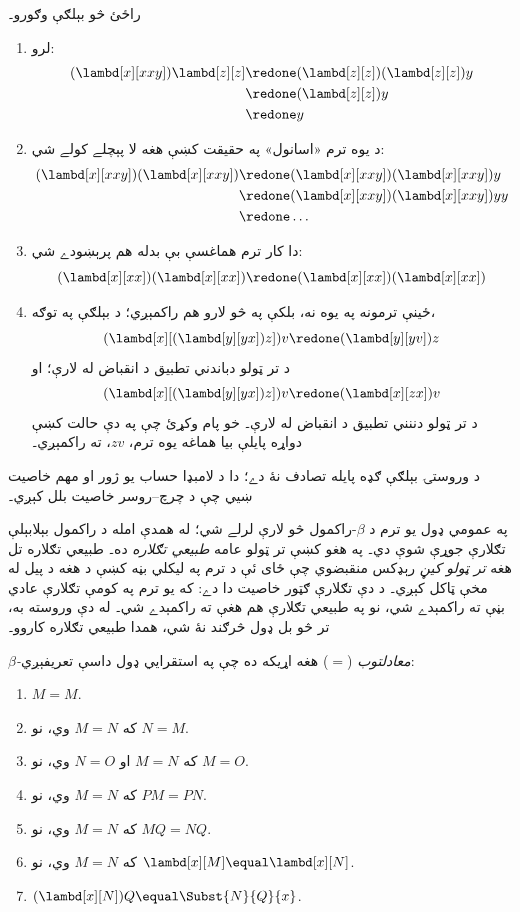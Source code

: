 \documentclass[../../../include/open-logic-section]{subfiles}
\begin{document}
راځئ څو بېلګې وګورو۔
\begin{enumerate}
\item لرو:
\begin{align*}
(\lambd[x][xxy]) \lambd[z][z] & \redone (\lambd[z][z])(\lambd[z][z]) y \\
& \redone (\lambd[z][z]) y \\
& \redone y
\end{align*}
\item د يوه ترم «اسانول» په حقيقت کښې هغه لا پېچلے کولے شي:
\begin{align*}
(\lambd[x][xxy])(\lambd[x][xxy]) & \redone (\lambd[x][xxy])(\lambd[x][xxy])y \\
& \redone (\lambd[x][xxy])(\lambd[x][xxy])yy \\
& \redone \dots
\end{align*}
\item دا کار ترم هماغسې بې بدله هم پرېښودے شي:
\[
(\lambd[x][xx])(\lambd[x][xx]) \redone (\lambd[x][xx])(\lambd[x][xx])
\]
\item ځينې ترمونه په يوه نه، بلکې په څو لارو هم راکمېږي؛
  د بېلګې په توګه،
\[
(\lambd[x][(\lambd[y][yx]) z]) v \redone (\lambd[y][yv]) z
\]
  د تر ټولو دباندني تطبيق د انقباض له لارې؛ او
\[
(\lambd[x][(\lambd[y][yx]) z]) v \redone (\lambd[x][zx]) v
\]
  د تر ټولو دننني تطبيق د انقباض له لارې۔ خو پام وکړئ
  چې په دې حالت کښې دواړه پايلې بيا هماغه يوه ترم،
  $zv$، ته راکمېږي۔
\end{enumerate}

د وروستۍ بېلګې ګډه پايله تصادف نۀ دے؛ دا د لامبډا
حساب يو ژور او مهم خاصيت ښيي چې د چرچ--روسر خاصيت
بلل کېږي۔

\begin{digress}
  په عمومي ډول يو ترم د $\beta$-راکمول څو لارې لرلے
  شي؛ له همدې امله د راکمول بېلابېلې تګلارې جوړې
  شوې دي۔ په هغو کښې تر ټولو عامه \emph{طبيعي تګلاره}
  ده۔ طبيعي تګلاره تل هغه \emph{تر ټولو کيڼ} رېډکس
  منقبضوي چې ځای ئې د ترم په ليکلي بڼه کښې د هغه
  د پيل له مخې ټاکل کېږي۔ د دې تګلارې ګټور خاصيت
  دا دے: که يو ترم په کومې تګلارې عادي بڼې ته
  راکمېدے شي، نو په طبيعي تګلارې هم هغې ته
  راکمېدے شي۔ له دې وروسته به، تر څو بل ډول
  څرګند نۀ شي، همدا طبيعي تګلاره کاروو۔
\end{digress}

\begin{defn}
  \emph{$\beta$-معادلتوب} ($\equal$) هغه اړيکه ده چې
  په استقرايي ډول داسې تعريفېږي:
  \begin{enumerate}
  \item $M \equal M$.
  \item که $M \equal N$ وي، نو $N \equal M$.
  \item که $M \equal N$ او $N \equal O$ وي، نو $M \equal O$.
  \item که $M \equal N$ وي، نو $PM \equal PN$.
  \item که $M \equal N$ وي، نو $MQ \equal NQ$.
  \item که $M \equal N$ وي، نو $\lambd[x][M] \equal \lambd[x][N]$.
  \item $(\lambd[x][N])Q \equal \Subst{N}{Q}{x}$.
  \end{enumerate}
\end{defn}
\end{document}
